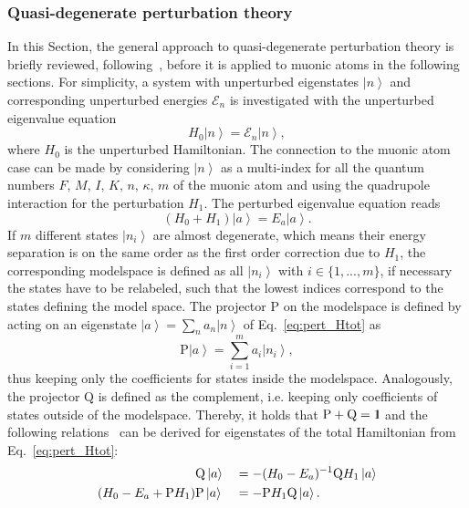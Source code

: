 \subsubsection{Quasi-degenerate perturbation theory}
\label{sec:almostDeg}
In this Section, the general approach to quasi-degenerate perturbation theory is briefly reviewed, following~\cite{BorieRinker1982,sakurai1994}, before it is applied to muonic atoms in the following sections. For simplicity, a system with unperturbed eigenstates $\left|n\right>$ and corresponding unperturbed energies $\mathcal{E}_n$ is investigated with the unperturbed eigenvalue equation
\begin{equation}
H_0 \left|n\right> = \mathcal{E}_n \left|n\right>,
\end{equation}
where $H_0$ is the unperturbed Hamiltonian.
The connection to the muonic atom case can be made by considering $\left|n\right>$ as a multi-index for all the quantum numbers $F,\,M,\,I,\,K,\,n,\,\kappa,\,m$ of the muonic atom and using the quadrupole interaction for the perturbation $H_1$. The perturbed eigenvalue equation reads
\begin{equation}
\label{eq:pert_Htot}
\left(H_0 + H_1\right) \left|a\right> = E_a \left|a\right>.
\end{equation}
If $m$ different states $\left| n_i \right>$ are almost degenerate, which means their energy separation is on the same order as the first order correction due to $H_1$, the corresponding modelspace is defined as all $\left| n_i \right>$ with $i\in \{1,...,m\}$, if necessary the states have to be relabeled, such that the lowest indices correspond to the states defining the model space. The projector $\text{P}$ on the modelspace is defined by acting on an eigenstate $\left|a\right> = \sum_n a_n \left|n\right>$ of Eq.~\eqref{eq:pert_Htot} as
\begin{equation}
\text{P}\left|a\right> = \sum_{i=1}^m a_i \left|n_i\right>,
\end{equation}
thus keeping only the coefficients for states inside the modelspace. Analogously, the projector $\text{Q}$ is defined as the complement, i.e. keeping only coefficients of states outside of the modelspace. Thereby, it holds that $\text{P}+\text{Q}=\rm 1\hspace*{-0.4ex}\rule{0.1ex}{1.52ex}\hspace*{0.2ex}$ and the following relations~\cite{BorieRinker1982} can be derived for eigenstates of the total Hamiltonian from Eq.~\eqref{eq:pert_Htot}:
\begin{alignat}{2}
&\text{Q}\left|a\right> &&= - (H_0-E_a)^{-1}\text{Q}H_1 \left|a\right>\notag\\
 (H_0-E_a+\text{P}H_1)&\text{P}\left|a\right>&&= -\text{P}H_1\text{Q}\left|a\right>.
\end{alignat}
